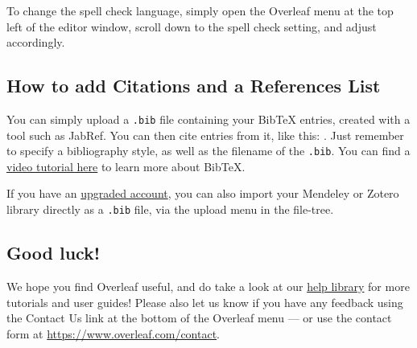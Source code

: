\documentclass[a4paper]{article}
\begin{document}
To change the spell check language, simply open the Overleaf menu at the top left of the editor window, scroll down to the spell check setting, and adjust accordingly.

\subsection{How to add Citations and a References List}

You can simply upload a \verb|.bib| file containing your BibTeX entries, created with a tool such as JabRef. You can then cite entries from it, like this: \cite{greenwade93}. Just remember to specify a bibliography style, as well as the filename of the \verb|.bib|. You can find a \href{https://www.overleaf.com/help/97-how-to-include-a-bibliography-using-bibtex}{video tutorial here} to learn more about BibTeX.

If you have an \href{https://www.overleaf.com/user/subscription/plans}{upgraded account}, you can also import your Mendeley or Zotero library directly as a \verb|.bib| file, via the upload menu in the file-tree.

\subsection{Good luck!}

We hope you find Overleaf useful, and do take a look at our \href{https://www.overleaf.com/learn}{help library} for more tutorials and user guides! Please also let us know if you have any feedback using the Contact Us link at the bottom of the Overleaf menu --- or use the contact form at \url{https://www.overleaf.com/contact}.



\end{document}
